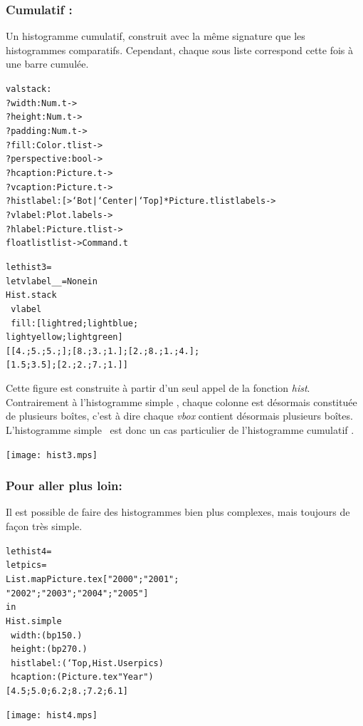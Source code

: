 \documentclass[a4paper,12pt]{article}
\begin{document}
\subsubsection{Cumulatif :} 
Un histogramme cumulatif, construit avec la même signature que les histogrammes comparatifs. Cependant, chaque sous liste correspond cette fois à une barre cumulée.
\begin{alltt}
  val stack :
  ?width:Num.t ->
  ?height:Num.t ->
  ?padding:Num.t ->
  ?fill:Color.t list ->
  ?perspective: bool ->
  ?hcaption:Picture.t ->
  ?vcaption:Picture.t ->
  ?histlabel:[> `Bot | `Center | `Top ] * Picture.t list labels ->
  ?vlabel:Plot.labels ->
  ?hlabel:Picture.t list -> 
  float list list -> Command.t
\end{alltt}

\bigskip

\begin{minipage}{0.5\linewidth}
  \begin{alltt}
    let hist3 =
    let vlabel _ _ = None in
    Hist.stack 
    ~vlabel
    ~fill:[lightred;lightblue;
      lightyellow;lightgreen]
    [[4.;5.;5.;]; [8.;3.;1.]; [2.;8.;1.;4.];
      [1.5;3.5];[2.;2.;7.;1.]]
  \end{alltt}
  
  Cette figure est construite à partir d'un seul appel de la fonction \textit{hist}. Contrairement à l'histogramme \og simple \fg, chaque colonne est désormais constituée de plusieurs boîtes, c'est à dire chaque \textit{vbox} contient désormais plusieurs boîtes. L'histogramme \og simple \fg\ est donc un cas particulier de l'histogramme \og cumulatif \fg.
\end{minipage}
\begin{minipage}{0.5\linewidth}
\begin{center}
\texttt{[image: hist3.mps]}
\end{center}
\end{minipage}

\subsubsection{Pour aller plus loin:}
Il est possible de faire des histogrammes bien plus complexes, mais toujours de façon très simple.

\begin{minipage}{0.5\linewidth}
  \begin{alltt}
    let hist4 =
    let pics =
    List.map Picture.tex ["2000";"2001";
      "2002";"2003";"2004";"2005"]
    in
    Hist.simple 
    ~width:(bp 150.)
    ~height:(bp 270.)
    ~histlabel:(`Top, Hist.User pics)
    ~hcaption:(Picture.tex "Year")
    [4.5;5.0;6.2;8.;7.2;6.1]
  \end{alltt}
\end{minipage}
\begin{minipage}{0.5\linewidth}
\begin{center}
\texttt{[image: hist4.mps]}
\end{center}
\end{minipage}
\end{document}
